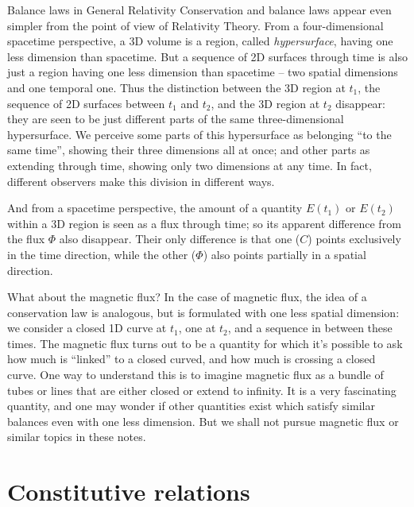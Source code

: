 \documentclass[a4paper,12pt,%
onecolumn,oneside,titlepage,%
british%
]{memoir}
\renewcommand*{\|}[1][]{\nonscript\:#1\vert\nonscript\:\mathopen{}}
\newcommand*{\yE}{E}
\newcommand*{\yH}{\varPhi}%
\begin{document}
\begin{extra}{Balance laws in General Relativity}
  Conservation and balance laws appear even simpler from the point of view of Relativity Theory. From a four-dimensional spacetime perspective, a 3D volume is a region, called \emph{hypersurface}, having one less dimension than spacetime. But a sequence of 2D surfaces through time is also just a region having one less dimension than spacetime -- two spatial dimensions and one temporal one. Thus the distinction between the 3D region at $t_{1}$, the sequence of 2D surfaces between $t_{1}$ and $t_{2}$, and the 3D region at $t_{2}$ disappear: they are seen to be just different parts of the same three-dimensional hypersurface. We perceive some parts of this hypersurface as belonging \enquote{to the same time}, showing their three dimensions all at once; and other parts as extending through time, showing only two dimensions at any time. In fact, different observers make this division in different ways.

  And from a spacetime perspective, the amount of a quantity $\yE(t_{1})$ or $\yE(t_{2})$ within a 3D region is seen as a flux through time; so its apparent difference from the flux $\yH$ also disappear. Their only difference is that one ($C$) points exclusively in the time direction, while the other ($\yH$) also points partially in a spatial direction.
\end{extra}


\begin{extra}{What about the magnetic flux?}
  In the case of magnetic flux, the idea of a conservation law is analogous, but is formulated with one less spatial dimension: we consider a closed 1D curve at $t_{1}$, one at $t_{2}$, and a sequence in between these times. The magnetic flux turns out to be a quantity for which it's possible to ask how much is \enquote{linked} to a closed curved, and how much is crossing a closed curve. One way to understand this is to imagine magnetic flux as a bundle of tubes or lines that are either closed or extend to infinity. It is a very fascinating quantity, and one may wonder if other quantities exist which satisfy similar balances even with one less dimension. But we shall not pursue magnetic flux or similar topics in these notes.
\end{extra}


\section{Constitutive relations}
\label{sec:constitutive}
\end{document}
